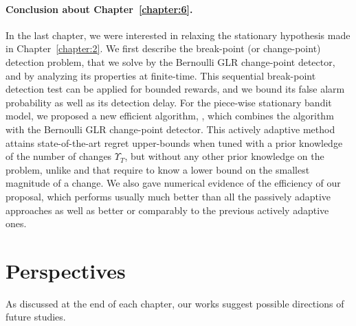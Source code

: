 \paragraph{Conclusion about \textbf{Chapter~\ref{chapter:6}}.}

In the last chapter, we were interested in relaxing the stationary hypothesis made in Chapter~\ref{chapter:2}.
%
We first describe the break-point (or change-point) detection problem, that we solve by the Bernoulli GLR change-point detector, and by analyzing its properties at finite-time.
This sequential break-point detection test can be applied for bounded rewards, and we bound its false alarm probability as well as its detection delay.
For the piece-wise stationary bandit model,
we proposed a new efficient algorithm, \GLRklUCB, which combines the \klUCB{} algorithm with the Bernoulli GLR change-point detector.
This actively adaptive method attains state-of-the-art regret upper-bounds when tuned with a prior knowledge of the number of changes $\Upsilon_T$, but without any other prior knowledge on the problem, unlike \CUSUMUCB{} and \MUCB{} that require to know a lower bound on the smallest magnitude of a change.
We also gave numerical evidence of the efficiency of our proposal, which performs usually much better than all the passively adaptive approaches as well as better or comparably to the previous actively adaptive ones.



\section{Perspectives}

As discussed at the end of each chapter,
our works suggest possible directions of future studies.





